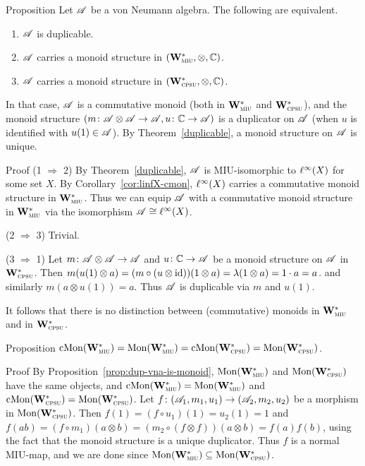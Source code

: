 \documentclass[a]{subfiles}
\begin{document}
\begin{parsec}
\begin{point}{Proposition}
\label{prop:dup-vna-is-monoid}
Let $\mathscr{A}$ be a von Neumann algebra.
The following are equivalent.
\begin{enumerate}
\item
$\mathscr{A}$ is duplicable.
\item
$\mathscr{A}$ carries a monoid structure in $(\mathbf{W}^*_{\text{\textsc{miu}}},\otimes,\mathbb{C})$.
\item
$\mathscr{A}$ carries a monoid structure in $(\mathbf{W}^*_{\text{\textsc{cpsu}}},\otimes,\mathbb{C})$.
\end{enumerate}
In that case, $\mathscr{A}$ is a commutative monoid
(both in $\mathbf{W}^*_{\text{\textsc{miu}}}$ and $\mathbf{W}^*_{\text{\textsc{cpsu}}}$),
and the monoid structure $(m\colon\mathscr{A}\otimes\mathscr{A}\to\mathscr{A},u\colon\mathbb{C}\to\mathscr{A})$
is a duplicator on $\mathscr{A}$
(when $u$ is identified with $u(1)\in\mathscr{A}$).
By Theorem~\ref{duplicable}, a monoid structure on $\mathscr{A}$ is unique.
\end{point}
\begin{point}{Proof}
(1 $\Rightarrow$ 2)
By Theorem~\ref{duplicable},
$\mathscr{A}$ is MIU-isomorphic to $\ell^\infty(X)$ for some set $X$.
By Corollary~\ref{cor:linfX-cmon},
$\ell^\infty(X)$ carries a commutative monoid structure in $\mathbf{W}^*_{\text{\textsc{miu}}}$.
Thus we can equip $\mathscr{A}$ with a commutative monoid structure in $\mathbf{W}^*_{\text{\textsc{miu}}}$
via the isomorphism $\mathscr{A}\cong\ell^\infty(X)$.

(2 $\Rightarrow$ 3) Trivial.

(3 $\Rightarrow$ 1)
Let $m\colon\mathscr{A}\otimes\mathscr{A}\to\mathscr{A}$ and $u\colon\mathbb{C}\to\mathscr{A}$ be a monoid structure
on $\mathscr{A}$ in $\mathbf{W}^*_{\text{\textsc{cpsu}}}$.
Then $m(u(1)\otimes a)=
(m\circ (u\otimes \operatorname{id}))(1\otimes a)=
\lambda(1\otimes a)=1\cdot a=a$.
and similarly $m(a\otimes u(1))=a$.
Thus $\mathscr{A}$ is duplicable via $m$ and $u(1)$.
\end{point}

It follows that there is no distinction
between (commutative) monoids in $\mathbf{W}^*_{\text{\textsc{miu}}}$ and in $\mathbf{W}^*_{\text{\textsc{cpsu}}}$.

\begin{point}{Proposition}
\label{prop:cmon-mon-vNA}
$\mathrm{cMon}(\mathbf{W}^*_{\text{\textsc{miu}}})
=\mathrm{Mon}(\mathbf{W}^*_{\text{\textsc{miu}}})
=\mathrm{cMon}(\mathbf{W}^*_{\text{\textsc{cpsu}}})
=\mathrm{Mon}(\mathbf{W}^*_{\text{\textsc{cpsu}}})$.
\end{point}
\begin{point}{Proof}
By Proposition~\ref{prop:dup-vna-is-monoid},
$\mathrm{Mon}(\mathbf{W}^*_{\text{\textsc{miu}}})$ and $\mathrm{Mon}(\mathbf{W}^*_{\text{\textsc{cpsu}}})$ have the same objects,
and $\mathrm{cMon}(\mathbf{W}^*_{\text{\textsc{miu}}})=\mathrm{Mon}(\mathbf{W}^*_{\text{\textsc{miu}}})$ and $\mathrm{cMon}(\mathbf{W}^*_{\text{\textsc{cpsu}}})=\mathrm{Mon}(\mathbf{W}^*_{\text{\textsc{cpsu}}})$.
Let $f\colon (\mathscr{A}_1,m_1,u_1)\to (\mathscr{A}_2,m_2,u_2)$
be a morphism in $\mathrm{Mon}(\mathbf{W}^*_{\text{\textsc{cpsu}}})$.
Then $f(1)=(f\circ u_1)(1)=u_2(1)=1$
and $f(ab)=(f\circ m_1)(a\otimes b)=(m_2\circ (f\otimes f))(a\otimes b)=f(a)f(b)$,
using the fact that the monoid structure is a unique duplicator.
Thus $f$ is a normal MIU-map, and
we are done since $\mathrm{Mon}(\mathbf{W}^*_{\text{\textsc{miu}}})\subseteq \mathrm{Mon}(\mathbf{W}^*_{\text{\textsc{cpsu}}})$.
\end{point}


\end{parsec}
\end{document}

